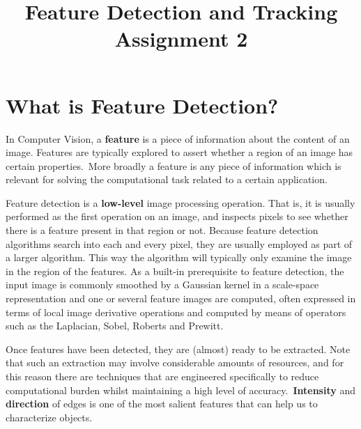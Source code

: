 \documentclass[conference]{IEEEtran}
\begin{document}
\title{Feature Detection and Tracking \\ Assignment 2}

\author{
}

\maketitle


\section{What is Feature Detection?}

In Computer Vision, a \textbf{feature} is a piece of information about the content of an image. Features are typically explored
to assert whether a region of an image has certain properties.\
More broadly a feature is any piece of information which is relevant for solving the computational task related to a
certain application.

Feature detection is a \textbf{low-level} image processing operation. That is, it is usually performed as the first operation on an image, and inspects pixels to see whether there is a feature present in that region or not. Because feature detection algorithms search into each and every pixel, they are usually employed as part of a larger algorithm. This way the algorithm will typically only examine the image in the region of the features. As a built-in prerequisite to feature detection, the input image is commonly smoothed by a Gaussian kernel in a scale-space representation and one or several feature images are computed, often expressed in terms of local image derivative operations and computed by means of operators such as the Laplacian, Sobel, Roberts and Prewitt.

Once features have been detected, they are (almost) ready to be extracted. Note that such an extraction may involve
considerable amounts of resources, and for this reason there are techniques that are engineered specifically to reduce
computational burden whilst maintaining a high level of accuracy.\
\textbf{Intensity} and \textbf{direction} of edges is one of the most salient features that can help us to characterize objects.
\end{document}

